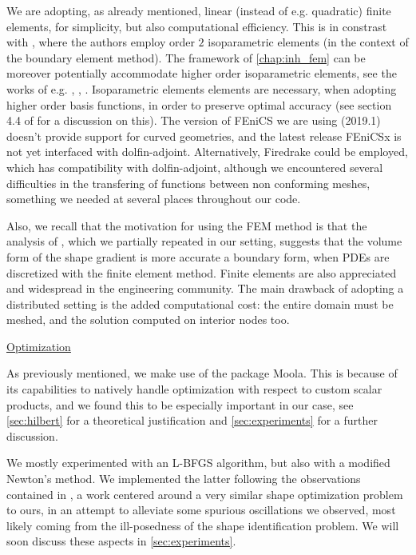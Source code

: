 \documentclass[english,a4paper,9pt,oneside]{scrbook}	%
\theoremstyle{break}
\theoremstyle{remark}
\begin{document}
We are adopting, as already mentioned, linear (instead of e.g. quadratic) finite elements, for simplicity, but also computational efficiency. This is in constrast with \cite{harbrecht}, where the authors employ order $2$ isoparametric elements (in the context of the boundary element method). The framework of \cref{chap:inh_fem} can be moreover potentially accommodate higher order isoparametric elements, see the works of e.g. \cite{edelmann}, \cite{elliott}, \cite{ranner}. Isoparametric elements elements are necessary, when adopting higher order basis functions, in order to preserve optimal accuracy (see section 4.4 of \cite{strang} for a discussion on this). The version of FEniCS we are using (2019.1) doesn't provide support for curved geometries, and the latest release FEniCSx is not yet interfaced with dolfin-adjoint. Alternatively, Firedrake could be employed, which has compatibility with dolfin-adjoint, although we encountered several difficulties in the transfering of functions between non conforming meshes, something we needed at several places throughout our code.

Also, we recall that the motivation for using the FEM method is that the analysis of \cite{paganini}, which we partially repeated in our setting, suggests that the volume form of the shape gradient is more accurate a boundary form, when PDEs are discretized with the finite element method. Finite elements are also appreciated and widespread in the engineering community.
The main drawback of adopting a distributed setting is the added computational cost: the entire domain must be meshed, and the solution computed on interior nodes too.

\underline{Optimization}

As previously mentioned, we make use of the package Moola. This is because of its capabilities to natively handle optimization with respect to custom scalar products, and we found this to be especially important in our case, see \cref{sec:hilbert} for a theoretical justification and \cref{sec:experiments} for a further discussion.

We mostly experimented with an L-BFGS algorithm, but also with a modified Newton's method. We implemented the latter following the observations contained in \cite{eppler}, a work centered around a very similar shape optimization problem to ours, in an attempt to alleviate some spurious oscillations we observed, most likely coming from the ill-posedness of the shape identification problem. We will soon discuss these aspects in \cref{sec:experiments}.
\end{document}
